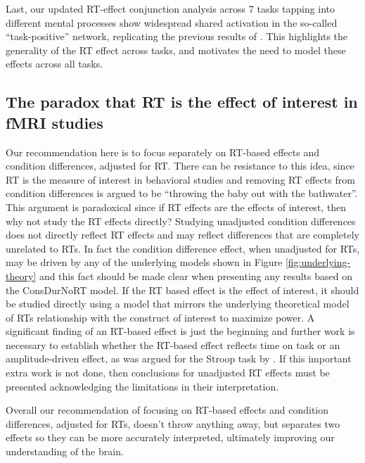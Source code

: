 \documentclass[titlepage,12pt] {article}
\begin{document}
Last, our updated RT-effect conjunction analysis across 7 tasks tapping into different mental processes show widespread shared activation in the so-called ``task-positive'' network, replicating the previous results of \citet{yarkoni_bold_2009}. This highlights the generality of the RT effect across tasks, and motivates the need to model these effects across all tasks.  

\subsection*{The paradox that RT is the effect of interest in fMRI studies}

Our recommendation here is to focus separately on RT-based effects and condition differences, adjusted for RT.  There can be resistance to this idea, since RT is the measure of interest in behavioral studies and removing RT effects from condition differences is argued to be ``throwing the baby out with the bathwater''.  This argument is paradoxical since if RT effects are the effects of interest, then why not study the RT effects directly? Studying unadjusted condition differences does not directly reflect RT effects and may reflect differences that are completely unrelated to RTs.  In fact the condition difference effect, when unadjusted for RTs, may be driven by any of the underlying models shown in Figure \ref{fig:underlying-theory} and this fact should be made clear when presenting any results based on the ConsDurNoRT model.  If the RT based effect is the effect of interest, it should be studied directly using a model that mirrors the underlying theoretical model of RTs relationship with the construct of interest to maximize power.  A significant finding of an RT-based effect is just the beginning and further work is necessary to establish whether the RT-based effect reflects time on task or an amplitude-driven effect, as was argued for the Stroop task by \citet{yeung_errors_2011}.  If this important extra work is not done, then conclusions for unadjusted RT effects must be presented acknowledging the limitations in their interpretation.

Overall our recommendation of focusing on RT-based effects and condition differences, adjusted for RTs, doesn't throw anything away, but separates two effects so they can be more accurately interpreted, ultimately improving our understanding of the brain. 
\end{document}
